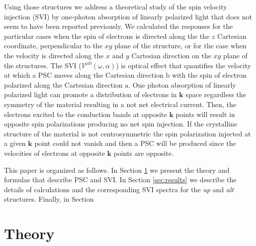 \documentclass[prb,11pt,tightenlines,twocolumn,aps]{revtex4-1}
\begin{document}
{Using those structures we address a theoretical study of the spin velocity
injection (SVI) by one-photon absorption of linearly polarized light that does
not seem to have been reported previously.
% 
We calculated the responses for the particular cases when the spin of electrons
is directed along the the $z$ Cartesian coordinate, perpendicular to the $xy$
plane of the structure, or for the case when the velocity is directed along the
$x$ and $y$ Cartesian direction on the $xy$ plane of the structures.
% 
The SVI ($\mathcal{V}^{\mathrm{ab}}(\omega,\alpha)$) is optical effect that
quantifies the velocity at which a PSC moves along the Cartesian direction
$\mathrm{b}$ with the spin of electron polarized along the Cartesian direction
$\mathrm{a}$. One photon absorption of linearly polarized light can promote a
distribution of electrons in $\mathbf{k}$ space regardless the symmetry of the
material resulting in a not net electrical current. Then, the electrons excited
to the conduction bands at opposite $\mathbf{k}$ points will result in opposite
spin polarizations producing no net spin injection.\cite{bhatPRL05} If the
crystalline structure of the material is not centrosymmetric the spin
polarization injected at a given $\mathbf{k}$ point could not
vanish\cite{alvaradoPRL85, schmiedeskampPRL88} and then a PSC will be produced
since the velocities of electrons at opposite $\mathbf{k}$ points are opposite.

This paper is organized as follows. In Section \ref{sec:theory} we present the
theory and formulas that describe PSC and SVI. In Section \ref{sec:results} we
describe the details of calculations and the corresponding SVI spectra for the 
\emph{up} and \emph{alt} structures. Finally, in Section 

}


\section{Theory} %
\label{sec:theory}
\end{document}
